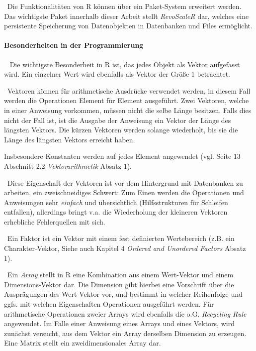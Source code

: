 ~\newline Die Funktionalitäten von R können über ein Paket-System erweitert werden. Das wichtigste Paket innerhalb dieser Arbeit stellt \textit{RevoScaleR} dar, welches eine persistente Speicherung von Datenobjekten in Datenbanken und Files ermöglicht. 

\paragraph{Besonderheiten in der Programmierung}~\newline
Die wichtigste Besonderheit in R ist, das jedes Objekt als Vektor aufgefasst wird. Ein einzelner Wert wird ebenfalls als Vektor der Größe 1 betrachtet.

~\newline Vektoren können für arithmetische Ausdrücke verwendet werden, in diesem Fall werden die Operationen Element für Element ausgeführt. Zwei Vektoren, welche in einer Anweisung vorkommen, müssen nicht die selbe Länge besitzen. Falls dies nicht der Fall ist, ist die Ausgabe der Anweisung ein Vektor der Länge des längsten Vektors. Die kürzen Vektoren werden solange wiederholt, bis sie die Länge des längsten Vektors erreicht haben.

Insbesondere Konstanten werden auf jedes Element angewendet (vgl. \cite{RIntro} Seite 13 Abschnitt 2.2 \textit{Vektorarithmetik} Absatz 1).

~\newline Diese Eigenschaft der Vektoren ist vor dem Hintergrund mit Datenbanken zu arbeiten, ein zweischneidiges Schwert: Zum Einen werden die Operationen und Anweisungen sehr \textit{einfach} und übersichtlich (Hilfsstrukturen für Schleifen entfallen), allerdings bringt v.a. die Wiederholung der kleineren Vektoren erhebliche Fehlerquellen mit sich. 

~\newline Ein Faktor ist ein Vektor mit einem fest definierten Wertebereich (z.B. ein Charakter-Vektor, Siehe auch \cite{RIntro} Kapitel 4 \textit{Ordered and Unordered Factors} Absatz 1).

~\newline Ein \textit{Array} stellt in R eine Kombination aus einem Wert-Vektor und einem Dimensions-Vektor dar. Die Dimension gibt hierbei eine Vorschrift über die Ausprägungen des Wert-Vektor vor, und bestimmt in welcher Reihenfolge und ggfs. mit welchen Eigenschaften Operationen ausgeführt werden. Für arithmetische Operationen zweier Arrays wird ebenfalls die o.G. \textit{Recycling Rule} angewendet. Im Falle einer Anweisung eines Arrays und eines Vektors, wird zunächst versucht, aus dem Vektor ein Array derselben Dimension zu erzeugen. Eine Matrix stellt ein zweidimensionales Array dar. 


